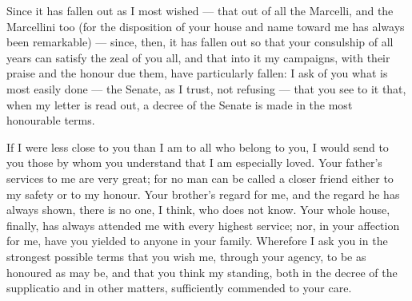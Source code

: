 

 Since it has fallen out as I most wished --- that out of all the Marcelli, and the Marcellini too (for the disposition of your house and name toward me has always been remarkable) --- since, then, it has fallen out so that your consulship of all years can satisfy the zeal of you all, and that into it my campaigns, with their praise and the honour due them, have particularly fallen: I ask of you what is most easily done --- the Senate, as I trust, not refusing --- that you see to it that, when my letter is read out, a decree of the Senate is made in the most honourable terms.

 If I were less close to you than I am to all who belong to you, I would send to you those by whom you understand that I am especially loved. Your father's services to me are very great; for no man can be called a closer friend either to my safety or to my honour. Your brother's regard for me, and the regard he has always shown, there is no one, I think, who does not know. Your whole house, finally, has always attended me with every highest service; nor, in your affection for me, have you yielded to anyone in your family. Wherefore I ask you in the strongest possible terms that you wish me, through your agency, to be as honoured as may be, and that you think my standing, both in the decree of the supplicatio and in other matters, sufficiently commended to your care.
